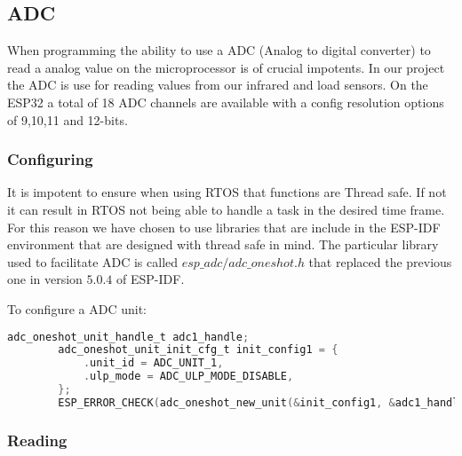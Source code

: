\documentclass[../report.tex]{subfiles}
\begin{document}
    \subsection{ADC}
    When programming the ability to use a ADC (Analog to digital converter) to
    read a analog value on the microprocessor is of crucial impotents. In our
    project the ADC is use for reading values from our infrared and load
    sensors. On the ESP32 a total of 18 ADC channels are available with a config
    resolution options of 9,10,11 and 12-bits.
    \subsubsection{Configuring}
    It is impotent to ensure when using RTOS that functions are Thread safe. If
    not it can result in RTOS not being able to handle a task in the desired
    time frame. For this reason we have chosen to use libraries that are
    include in the ESP-IDF environment that are designed with thread safe in
    mind. The particular library used to facilitate ADC is called
    $esp\_adc/adc\_oneshot.h$ that replaced the previous one in version $5.0.4$ of
    ESP-IDF. 

    To configure a ADC unit:
    \begin{lstlisting}[language=c, caption={Configuring ADC unit 1}]
        adc_oneshot_unit_handle_t adc1_handle;
        adc_oneshot_unit_init_cfg_t init_config1 = {
            .unit_id = ADC_UNIT_1,
            .ulp_mode = ADC_ULP_MODE_DISABLE,
        };
        ESP_ERROR_CHECK(adc_oneshot_new_unit(&init_config1, &adc1_handle));
    \end{lstlisting}
    \subsubsection{Reading}
    
\end{document}
